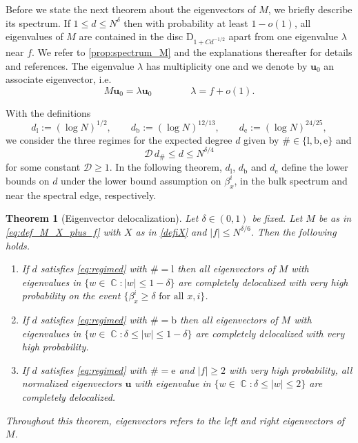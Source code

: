 \documentclass[10pt,a4paper]{amsart}
\DeclareMathOperator{\CC}{\mathbb{C}}
\newcommand{\abs}[1]{\left| #1 \right|}
\newtheorem{thm}[thhm]{Theorem}
\numberwithin{equation}{section}
\begin{document}
	Before we state the next theorem about the eigenvectors of $M$, we briefly describe its spectrum. If $1 \le d \le N^{\delta}$ then with probability at least $1 - o(1)$, all eigenvalues of $M$ are contained in the disc $\mathrm{D}_{1 + Cd^{-1/2}}$ apart from one eigenvalue $\lambda$ near $f$. We refer to \cref{prop:spectrum_M} and the explanations thereafter for details and references. 
	 The eigenvalue $\lambda$ has multiplicity one and we denote by $\mathbf{u}_0$ an 
	 associate eigenvector, i.e.\ 
	 \begin{equation} \label{eq:eigenvector_u_0} 
	 M \mathbf{u}_0 = \lambda \mathbf{u}_0 \qquad \qquad \lambda = f + o(1). 
	 \end{equation} 
	 
	 With the definitions  
	 	\begin{equation} \label{eq:def_d_hash} 
	d_\mathrm{l} :=  (\log N)^{1/2}, 
	\qquad d_\mathrm{b} :=  (\log N)^{12/13}, \qquad 
	d_\mathrm{e} :=  (\log N)^{24/25}, 
	\end{equation} 
	 we consider the three regimes for the expected degree $d$ given by $\# \in \{ \mathrm{l}, \mathrm{b}, \mathrm{e}\}$ and  
	\begin{equation}\label{eq:regimed}
	\mathcal D \,  d_\# \leq  d \le N^{\delta/4}  
	\end{equation}
for some constant $\mathcal D \geq 1$.  
In the following theorem, $d_\mathrm{l}$, $d_\mathrm{b}$ and $d_\mathrm{e}$ define the lower bounds on $d$ under the lower bound assumption on $\beta_x^i$, in the bulk spectrum and near the spectral edge, respectively. 

		\begin{thm}[Eigenvector delocalization]\label{thm:condideloc}
	 Let $\delta \in (0,1)$ be fixed. Let $M$ be as in \cref{eq:def_M_X_plus_f} with $X$ as in \cref{defiX} and $\abs{f} \leq N^{\delta/6}$. Then the following holds. 
		\begin{enumerate}[label=(\roman*)]
			\item \label{item:thm_cond_deloc_small_eigenvec}
			 If $d$ satisfies \cref{eq:regimed} with $\# = \mathrm{l}$ then  all eigenvectors of $M$ with eigenvalues in $\{ w \in \CC \colon \abs{w} \le 1-\delta\}$ are completely delocalized with very high probability on the event $\{ \beta_{x}^i \ge \delta \text{ for all } x,i \}$. 
			\item 
			 If $d$ satisfies \cref{eq:regimed} with $\# = \mathrm{b}$ then all eigenvectors of $M$ with eigenvalues in $\{ w \in \CC \colon \delta \leq \abs{w} \leq 1- \delta\}$ are completely delocalized with very high probability. 
		\item\label{item:thm_cond_deloc_large_eigenvec} If $d$ satisfies \cref{eq:regimed} with $\# = \mathrm{e}$ and $|f| \ge 2 $ with very high probability, all normalized eigenvectors $\mathbf{u}$  with eigenvalue in $\{w \in \CC \colon \delta \leq \abs{w} \leq 2\}$ are completely delocalized.  
		\end{enumerate}
		Throughout this theorem, eigenvectors refers to the left and right eigenvectors of $M$. 
	\end{thm}
	
\end{document}
